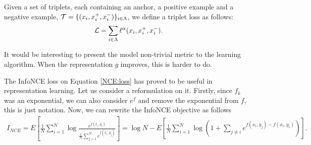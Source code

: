 \begin{ndef}
Given a set of triplets, each containing an anchor, a positive example and a negative example, $\mathcal T = \{(x_i,x^+_i,x^-_i)\}_{i \in \Lambda}$, we define a triplet loss as follows:
\begin{equation}
\mathcal L = \sum_{i \in \Lambda} \ell^\alpha(x_i,x^+_i,x^-_i).
\end{equation}

\end{ndef}



It would be interesting to present the model non-trivial metric to the learning algorithm. When the representation $g$ improves, this is harder to do.

The InfoNCE loss on Equation \ref{NCE:loss} has proved to be useful in representation learning. Let us consider a reformulation on it. Firstly, since $f_k$ was an exponential, we can also consider $e^f$ and remove the exponential from $f$, this is just notation. Now, we can rewrite the InfoNCE objective as follows
\begin{align*}
I_{NCE} = E\left[ \frac{1}{N} \sum_{i = 1}^N \log \frac{e^{f(x_i,y_i)}}{\frac{1}{N}\sum_{j=1}^N e^{f(x_i,y_j)}}\right] = \log N - E\left[ \frac{1}{N} \sum_{i=1}^N \log \left( 1+ \sum_{j\neq i}e^{f(x_i,y_j)- f(x_i,y_i)}\right)\right].
\end{align*}

